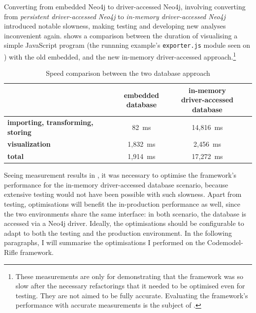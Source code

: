 Converting from embedded Neo4j to driver-accessed Neo4j, involving converting from \emph{persistent driver-accessed Neo4j} to \emph{in-memory driver-accessed Neo4j} introduced notable slowness, making testing and developing new analyses inconvenient again.  shows a comparison between the duration of visualising a simple JavaScript program (the runnning example's \lstinline{exporter.js} module seen on ) with the old embedded, and the new in-memory driver-accessed approach.\footnote{These measurements are only for demonstrating that the framework was so slow after the necessary refactorings that it needed to be optimised even for testing. They are not aimed to be fully accurate. Evaluating the framework's performance with accurate measurements is the subject of .}

\begin{table}[!htb]
	\centering
	\begin{tabular}{l|cc}
		\toprule
																								& \shortstack{\textbf{embedded} \\ \textbf{database}}
																								& \shortstack{\textbf{in-memory} \\ \textbf{driver-accessed database}}
																								\\
		\midrule
		\textbf{importing, transforming, storing}   &   82~ms      &   14,816~ms    \\
		\textbf{visualization}                      &   1,832~ms   &   2,456~ms    \\
		\midrule
		\textbf{total}                              &   1,914~ms   &   17,272~ms   \\
		\bottomrule
	\end{tabular}

	\caption{Speed comparison between the two database approach}
	\label{table:embedded-vs-in-memory-remote-table}
\end{table}

Seeing measurement results in , it was necessary to optimise the framework's performance for the in-memory driver-accessed database scenario, because extensive testing would not have been possible with such slowness. Apart from testing, optimisations will benefit the in-production performance as well, since the two environments share the same interface: in both scenario, the database is accessed via a Neo4j driver. Ideally, the optimisations should be configurable to adapt to both the testing and the production environment. In the following paragraphs, I will summarise the optimisations I performed on the Codemodel-Rifle framework.

